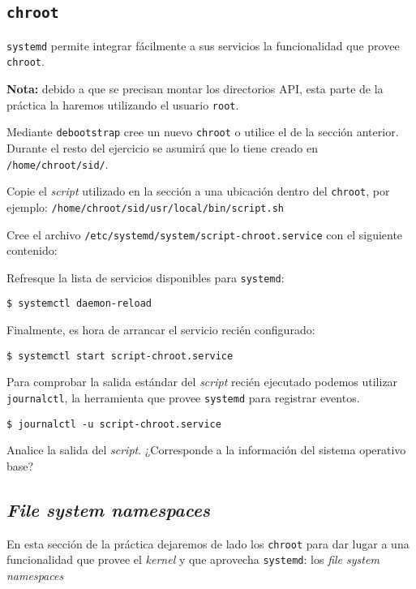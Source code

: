 \subsection{\texttt{chroot}}
\texttt{systemd} permite integrar fácilmente a sus servicios la
funcionalidad que provee \texttt{chroot}.

\textbf{Nota:} debido a que se precisan montar los directorios API, esta
parte de la práctica la haremos utilizando el usuario \texttt{root}.
\begin{questions}
  \question Mediante \texttt{debootstrap} cree un nuevo \texttt{chroot} o
  utilice el de la sección anterior. Durante el resto del ejercicio se
  asumirá que lo tiene creado en \texttt{/home/chroot/sid/}.

  \question Copie el \textit{script} utilizado en la sección a una
  ubicación dentro del \texttt{chroot}, por ejemplo:
  \texttt{/home/chroot/sid/usr/local/bin/script.sh}

  \question Cree el archivo
  \texttt{/etc/systemd/system/script-chroot.service} con el siguiente
  contenido:

  

  \question Refresque la lista de servicios disponibles para
  \texttt{systemd}:
  \begin{verbatim}
$ systemctl daemon-reload
\end{verbatim}

    \question Finalmente, es hora de arrancar el servicio recién configurado:
\begin{verbatim}
$ systemctl start script-chroot.service
\end{verbatim}

    \question Para comprobar la salida estándar del \textit{script} recién
    ejecutado podemos utilizar \texttt{journalctl}, la herramienta que
    provee \texttt{systemd} para registrar eventos.
\begin{verbatim}
$ journalctl -u script-chroot.service
\end{verbatim}

    Analice la salida del \textit{script}. ¿Corresponde a la información
    del sistema operativo base?   

\end{questions}

\subsection{\textit{File system namespaces}}
En esta sección de la práctica dejaremos de lado los \texttt{chroot} para
dar lugar a una funcionalidad que provee el \textit{kernel} y que aprovecha
\texttt{systemd}: los \textit{file system namespaces}

